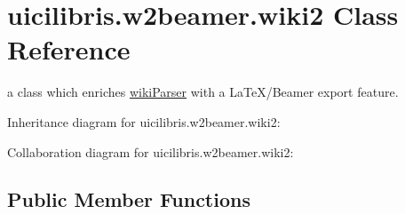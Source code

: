 \hypertarget{classuicilibris_1_1w2beamer_1_1wiki2}{\section{uicilibris.\-w2beamer.\-wiki2 \-Class \-Reference}
\label{classuicilibris_1_1w2beamer_1_1wiki2}
}


a class which enriches \hyperlink{namespaceuicilibris_1_1wikiParser}{wiki\-Parser} with a \-La\-Te\-X/\-Beamer export feature.  




\-Inheritance diagram for uicilibris.\-w2beamer.\-wiki2\-:


\-Collaboration diagram for uicilibris.\-w2beamer.\-wiki2\-:
\subsection*{\-Public \-Member \-Functions}
